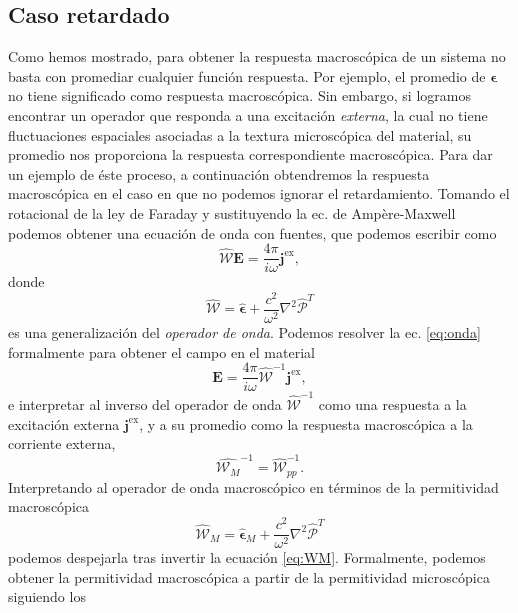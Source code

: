 \documentclass[12pt]{article}
\begin{document}
\subsection{Caso retardado}\label{sec:ret}
Como hemos mostrado, para obtener la respuesta
macroscópica de un sistema no basta con promediar cualquier función
respuesta. Por ejemplo, el promedio de $\bm\epsilon$ no tiene
significado como respuesta macroscópica. Sin embargo, si logramos
encontrar un operador que responda a una excitación {\em externa},
la cual no tiene fluctuaciones espaciales asociadas a la textura
microscópica del material, su promedio nos proporciona la
respuesta correspondiente macroscópica. Para dar un ejemplo de éste
proceso, a continuación obtendremos la respuesta macroscópica en el
caso en que no podemos ignorar el retardamiento. Tomando el
rotacional de la ley de Faraday y sustituyendo la ec. de Ampère-Maxwell
podemos obtener una ecuación de onda con fuentes, que podemos escribir
como
\begin{equation}
  \label{eq:onda}
  \hat{\mathcal W}\bm E=\frac{4\pi}{i\omega}\bm j^{\text{ex}},
\end{equation}
donde
\begin{equation}
  \label{eq:opW}
  \hat{\mathcal
    W}=\hat{\bm\epsilon}+\frac{c^2}{\omega^2}\nabla^2\hat{\mathcal P}^T
\end{equation}
es una generalización del {\em operador de onda}.
Podemos resolver la ec. \eqref{eq:onda} formalmente para obtener
el campo en el material
\begin{equation}
  \label{eq:ondasol}
  \bm E=\frac{4\pi}{i\omega}\hat{\mathcal W}^{-1} \bm j^{\text{ex}},
\end{equation}
e interpretar al inverso del operador de onda
$\hat{\mathcal W}^{-1}$ como una respuesta a la excitación externa
$\bm j^{\text{ex}}$, y a su promedio como la
respuesta macroscópica a la corriente externa,
\begin{equation}
  \label{eq:WM}
  \hat{\mathcal W_M}^{-1}=\hat{\mathcal W}^{-1}_{pp}.
\end{equation}
Interpretando al operador de onda macroscópico en términos de la
permitividad macroscópica
\begin{equation}
  \label{eq:opWM}
  \hat{\mathcal
    W}_M=\hat{\bm\epsilon}_M+\frac{c^2}{\omega^2}\nabla^2\hat{\mathcal P}^T
\end{equation}
podemos despejarla tras invertir la ecuación
\eqref{eq:WM}. Formalmente, podemos obtener la permitividad
macroscópica a partir de la permitividad microscópica siguiendo los
\end{document}
